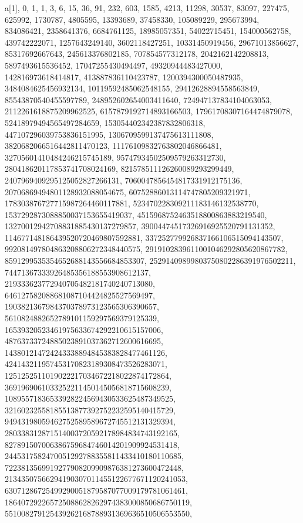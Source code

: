 {{a[1], {0, 1, 1, 3, 6, 15, 36, 91, 232, 603, 1585, 4213, 11298, 30537, 
   83097, 227475, 625992, 1730787, 4805595, 13393689, 37458330, 105089229, 
   295673994, 834086421, 2358641376, 6684761125, 18985057351, 54022715451, 
   154000562758, 439742222071, 1257643249140, 3602118427251, 10331450919456, 
   29671013856627, 85317692667643, 245613376802185, 707854577312178, 
   2042162142208813, 5897493615536452, 17047255430494497, 49320944483427000, 
   142816973618414817, 413887836110423787, 1200394300050487935, 
   3484084625456932134, 10119592485062548155, 29412628894558563849, 
   85543870540455597789, 248952602654003411640, 724947137834104063053, 
   2112261618875209962525, 6157879192714893166503, 17961708307164474879078, 
   52418979494565497284659, 153054402342387832806318, 
   447107296039753836151995, 1306709599137475613111808, 
   3820682066516442811470123, 11176109832763802046866481, 
   32705601410484246215745189, 95747934502509579263312730, 
   280418620117853741708024169, 821578511126260089293299449, 
   2407969409295125052827266131, 7060047856454817331912175136, 
   20706869494801128932088054675, 60752886013114747805209321971, 
   178303876727715987264460117881, 523470228309211183146132538770, 
   1537292873088850037153655419037, 4515968752463518800863883219540, 
   13270012942708831885430137279857, 39004474517326916925520791131352, 
   114677148186439520720469807592881, 337252779926837166106515094143507, 
   992081497804863208806272348440575, 2919102839611001046292805620867782, 
   8591299535354652688143556684853307, 25291409899803750802286391976502211, 
   74471367333926485356188553908612137, 219333623772940705482181740240713080, 
   646127582088681087104424825527569497, 
   1903821367984370378973123565306390657, 
   5610824882652789101159297569379125339, 
   16539320523461975633674292210615157006, 
   48763733724885023891037362712600616695, 
   143801214724243338894845383828477461126, 
   424143211957453170823189308473526283071, 
   1251252511019022217034672218022874172864, 
   3691969061033252211450145056818715608239, 
   10895571836533928224569430533625487349525, 
   32160232558185513877392752232595140415729, 
   94943198059462752589589672745512131329394, 
   280338312871514003720592178984834743192165, 
   827891507006386759684746014201909924531418, 
   2445317582470051292788355811433410180110685, 
   7223813569919277908209909876381273600472448, 
   21343507566294190307011455122677671120241053, 
   63071286725499290051879587077009179781061461, 
   186407292265725088628262974383000850686750119, 
   551008279125439262168788931369636510506553550, 
}}}
